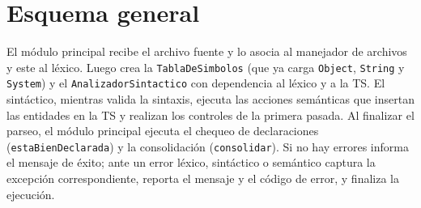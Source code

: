 \documentclass[11pt,a4paper]{article}
\begin{document}
\section{Esquema general}

El módulo principal recibe el archivo fuente y lo asocia al manejador de archivos y
este al léxico. Luego crea la \texttt{TablaDeSimbolos} (que ya carga \texttt{Object},
\texttt{String} y \texttt{System}) y el \texttt{AnalizadorSintactico} con dependencia
al léxico y a la TS. El sintáctico, mientras valida la sintaxis, ejecuta las acciones
semánticas que insertan las entidades en la TS y realizan los controles de la primera
pasada. Al finalizar el parseo, el módulo principal ejecuta el chequeo de
declaraciones (\texttt{estaBienDeclarada}) y la consolidación (\texttt{consolidar}).
Si no hay errores informa el mensaje de éxito; ante un error léxico, sintáctico o
semántico captura la excepción correspondiente, reporta el mensaje y el código de
error, y finaliza la ejecución.
\end{document}
